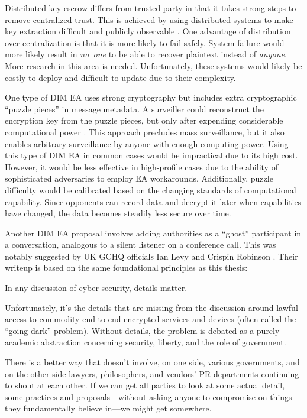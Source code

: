 \documentclass[conference]{IEEEtran}
\def\ii#1{\mbox{\textit{#1}}}
\begin{document}
Distributed key escrow differs from trusted-party in that it takes strong steps to remove centralized trust. This is
achieved by using distributed systems to make key extraction difficult and publicly observable \cite{phan_key_2017}
\cite{servan_schreiber_jje_2020}. One advantage of distribution over centralization is that it is more likely to fail
safely. System failure would more likely result in \ii{no one} to be able to recover plaintext instead of \ii{anyone}.
More research in this area is needed. Unfortunately, these systems would likely be costly to deploy and difficult to
update due to their complexity.

One type of \ac{DIM} \ac{EA} uses strong cryptography but includes extra cryptographic ``puzzle pieces'' in message
metadata. A surveiller could reconstruct the encryption key from the puzzle pieces, but only after expending
considerable computational power \cite{bellare_translucent_1996} \cite{wright_crypto_2018}. This approach precludes mass
surveillance, but it also enables arbitrary surveillance by anyone with enough computing power. Using this type of
\ac{DIM} \ac{EA} in common cases would be impractical due to its high cost. However, it would be less effective in
high-profile cases due to the ability of sophisticated adversaries to employ \ac{EA} workarounds. Additionally, puzzle
difficulty would be calibrated based on the changing standards of computational capability. Since opponents can record
data and decrypt it later when capabilities have changed, the data becomes steadily less secure over time.

Another \ac{DIM} \ac{EA} proposal involves adding authorities as a ``ghost'' participant in a conversation, analogous to
a silent listener on a conference call. This was notably suggested by UK \ac{GCHQ} officials Ian Levy and Crispin
Robinson \cite{levy_robinson_2018}. Their writeup is based on the same foundational principles as this thesis:

\begin{displayquote}
In any discussion of cyber security, details matter.

Unfortunately, it's the details that are missing from the discussion around lawful access to commodity end-to-end
encrypted services and devices (often called the ``going dark'' problem). Without details, the problem is debated as a
purely academic abstraction concerning security, liberty, and the role of government.

There is a better way that doesn’t involve, on one side, various governments, and on the other side lawyers,
philosophers, and vendors' PR departments continuing to shout at each other. If we can get all parties to look at some
actual detail, some practices and proposals---without asking anyone to compromise on things they fundamentally believe
in---we might get somewhere.
\cite{levy_robinson_2018}
\end{displayquote}
\end{document}
